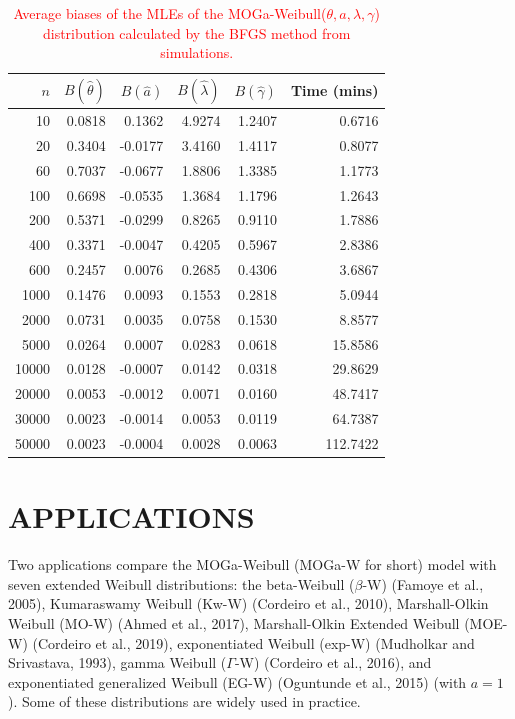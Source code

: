 \documentclass[twoside,leqno,11pt]{article}
\begin{document}
\begin{table}[H]
	\centering
\caption{\textcolor{red}{Average biases of the MLEs of the MOGa-Weibull($\theta, a, \lambda, \gamma$) distribution calculated 
by the BFGS method from simulations.}}\label{tab:bias2}
	\begin{tabular}{rrrrrr}
		\hline
		$n$ & $B(\hat{\theta})$ & $B(\hat{a})$ & $B(\hat{\lambda})$ & $B(\hat{\gamma})$ & Time (mins)\\
		\hline
		10 & 0.0818 & 0.1362 & 4.9274 & 1.2407 & 0.6716 \\ 
		20 & 0.3404 & -0.0177 & 3.4160 & 1.4117 & 0.8077 \\ 
		60 & 0.7037 & -0.0677 & 1.8806 & 1.3385 & 1.1773 \\ 
		100 & 0.6698 & -0.0535 & 1.3684 & 1.1796 & 1.2643 \\ 
		200 & 0.5371 & -0.0299 & 0.8265 & 0.9110 & 1.7886 \\ 
		400 & 0.3371 & -0.0047 & 0.4205 & 0.5967 & 2.8386 \\ 
		600 & 0.2457 & 0.0076 & 0.2685 & 0.4306 & 3.6867 \\ 
		1000 & 0.1476 & 0.0093 & 0.1553 & 0.2818 & 5.0944 \\ 
		2000 & 0.0731 & 0.0035 & 0.0758 & 0.1530 & 8.8577 \\ 
		5000 & 0.0264 & 0.0007 & 0.0283 & 0.0618 & 15.8586 \\ 
		10000 & 0.0128 & -0.0007 & 0.0142 & 0.0318 & 29.8629 \\ 
		20000 & 0.0053 & -0.0012 & 0.0071 & 0.0160 & 48.7417 \\ 
		30000 & 0.0023 & -0.0014 & 0.0053 & 0.0119 & 64.7387 \\ 
		50000 & 0.0023 & -0.0004 & 0.0028 & 0.0063 & 112.7422 \\ 
		\hline
\end{tabular}
\end{table}

\section{APPLICATIONS}\label{applications}

Two applications compare the MOGa-Weibull (MOGa-W for short) 
model with seven extended Weibull distributions: the 
beta-Weibull ($\beta$-W) (Famoye et al., 2005), 
Kumaraswamy Weibull (Kw-W) (Cordeiro et al., 2010), 
Marshall-Olkin Weibull (MO-W) (Ahmed et al., 2017), 
Marshall-Olkin Extended Weibull (MOE-W) (Cordeiro et al., 2019), exponentiated Weibull (exp-W) (Mudholkar and Srivastava, 1993), gamma Weibull ($\Gamma$-W) (Cordeiro et al., 2016), 
and exponentiated generalized Weibull 
(EG-W) (Oguntunde et al., 2015) (with $a=1$). Some of 
these distributions are widely used in practice.
\end{document}
